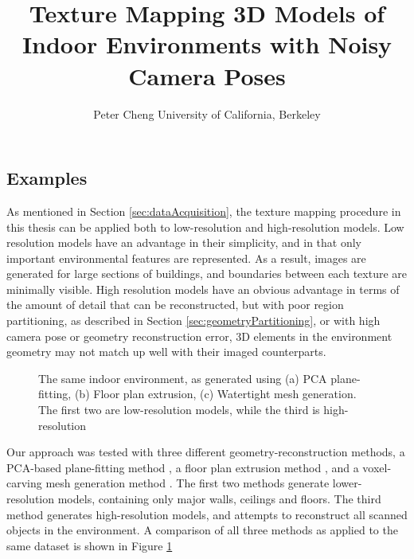 \message{ !name(masters.tex)}\documentclass[]{spie}  %
\title{Texture Mapping 3D Models of Indoor Environments with Noisy Camera Poses}
\author{Peter Cheng
\skiplinehalf
University of California, Berkeley\\
}
\begin{document}
\subsection{Examples}
\label{sec:examples}
As mentioned in Section \ref{sec:dataAcquisition}, the texture mapping
procedure in this thesis can be applied both to low-resolution and
high-resolution models. Low resolution models have an advantage in
their simplicity, and in that only important environmental features
are represented. As a result, images are generated for large sections
of buildings, and boundaries between each texture are minimally
visible. High resolution models have an obvious advantage in terms of
the amount of detail that can be reconstructed, but with poor region
partitioning, as described in Section \ref{sec:geometryPartitioning},
or with high camera pose or geometry reconstruction error, 3D elements
in the environment geometry may not match up well with their imaged
counterparts.

\begin{figure}
  \centering

  \caption{The same indoor environment, as generated using (a) PCA
    plane-fitting, (b) Floor plan extrusion, (c) Watertight mesh
    generation. The first two are low-resolution models, while the
    third is high-resolution}
  \label{fig:modelcomparisons}
\end{figure}

Our approach was tested with three different geometry-reconstruction
methods, a PCA-based plane-fitting method \cite{sanchez2012point}, a
floor plan extrusion method \cite{turnerfloorplan}, and a
voxel-carving mesh generation method \cite{turnerwatertight}. The
first two methods generate lower-resolution models, containing only
major walls, ceilings and floors. The third method generates
high-resolution models, and attempts to reconstruct all scanned
objects in the environment. A comparison of all three methods as
applied to the same dataset is shown in Figure
\ref{fig:modelcomparisons}
\end{document}

